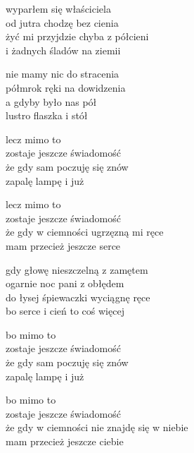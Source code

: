 \begin{text}
    wyparłem się właściciela\\
    od jutra chodzę bez cienia\\
    żyć mi przyjdzie chyba z półcieni\\
    i żadnych śladów na ziemii

    nie mamy nic do stracenia\\
    półmrok ręki na dowidzenia\\
    a gdyby było nas pół\\
    lustro flaszka i stół

    \vin lecz mimo to\\
    \vin zostaje jeszcze świadomość\\
    \vin że gdy sam poczuję się znów\\
    \vin zapalę lampę i już

    lecz mimo to\\
    zostaje jeszcze świadomość\\
    że gdy w ciemności ugrzęzną mi ręce\\
    mam przecież jeszcze serce

    gdy głowę nieszczelną z zamętem\\
    ogarnie noc pani z obłędem\\
    do łysej śpiewaczki wyciągnę ręce\\
    bo serce i cień to coś więcej

    \vin bo mimo to\\
    \vin zostaje jeszcze świadomość\\
    \vin że gdy sam poczuję się znów\\
    \vin zapalę lampę i już

    \vin bo mimo to\\
    \vin zostaje jeszcze świadomość\\
    \vin że gdy w ciemności nie znajdę się w niebie\\
    \vin mam przecież jeszcze ciebie
\end{text}
\begin{chord}

\end{chord}